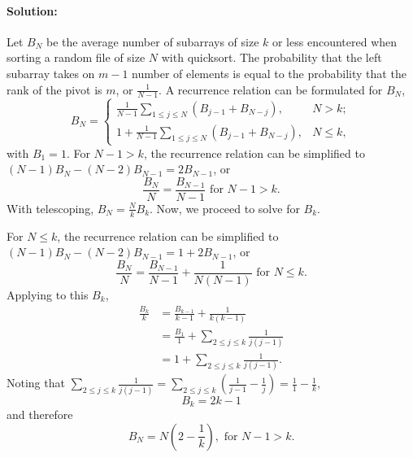\documentclass{article}
\begin{document}
\paragraph{Solution:} Let $B_N$ be the average number of subarrays of size $k$
or less encountered when sorting a random file of size $N$ with quicksort.
The probability that the left subarray takes on $m - 1$ number of elements is
equal to the probability that the rank of the pivot is $m$, or $\frac{1}{N -
1}$. A recurrence relation can be formulated for $B_N$,
\begin{equation*}
  B_N = \begin{cases}
    \frac{1}{N - 1}\sum_{1 \leq j \leq N}(B_{j - 1} + B_{N - j}), &N > k; \\
    1 + \frac{1}{N - 1}\sum_{1 \leq j \leq N}(B_{j - 1} + B_{N - j}), &N \leq
      k,
  \end{cases}
\end{equation*} with $B_1 = 1$. For $N - 1 > k$, the recurrence relation can be
simplified to $(N - 1)B_N - (N - 2)B_{N - 1} = 2B_{N - 1}$, or
\begin{equation*}
  \frac{B_N}{N} = \frac{B_{N - 1}}{N - 1} \text{ for } N - 1 > k.
\end{equation*} With telescoping, $B_N = \frac{N}{k}B_k$. Now, we proceed to
solve for $B_k$.

For $N \leq k$, the recurrence relation can be simplified to $(N - 1)B_N - (N -
2)B_{N - 1} = 1 + 2B_{N - 1}$, or \begin{equation*}
  \frac{B_N}{N} = \frac{B_{N - 1}}{N - 1} + \frac{1}{N(N - 1)} \text{ for } N
    \leq k.
\end{equation*} Applying to this $B_k$, \begin{align*}
  \frac{B_k}{k} &= \frac{B_{k - 1}}{k - 1} + \frac{1}{k(k - 1)} \\
    &= \frac{B_1}{1} + \sum_{2 \leq j \leq k}\frac{1}{j(j - 1)} \\
    &= 1 + \sum_{2 \leq j \leq k}\frac{1}{j(j - 1)}.
\end{align*} Noting that $\sum_{2 \leq j \leq k}\frac{1}{j(j - 1)} = \sum_{2
\leq j \leq k}\left(\frac{1}{j - 1} - \frac{1}{j}\right) = \frac{1}{1} -
\frac{1}{k}$, \begin{equation*}
  B_k = 2k - 1
\end{equation*} and therefore \begin{equation*}
  B_N = N\left(2 - \frac{1}{k}\right), \text{ for } N - 1 > k.
\end{equation*}
\end{document}

